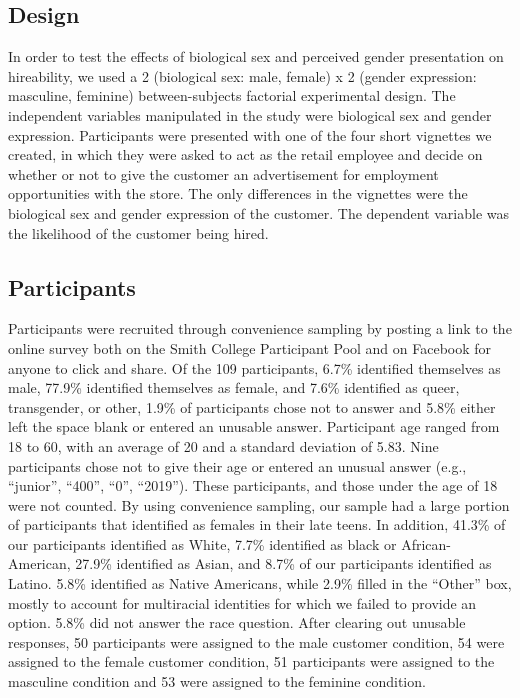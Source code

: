 \documentclass[english,man]{apa6}
\theoremstyle{definition}
\theoremstyle{definition}
\theoremstyle{remark}
\begin{document}
\subsection{Design}\label{design}

In order to test the effects of biological sex and perceived gender
presentation on hireability, we used a 2 (biological sex: male, female)
x 2 (gender expression: masculine, feminine) between-subjects factorial
experimental design. The independent variables manipulated in the study
were biological sex and gender expression. Participants were presented
with one of the four short vignettes we created, in which they were
asked to act as the retail employee and decide on whether or not to give
the customer an advertisement for employment opportunities with the
store. The only differences in the vignettes were the biological sex and
gender expression of the customer. The dependent variable was the
likelihood of the customer being hired.

\subsection{Participants}\label{participants}

Participants were recruited through convenience sampling by posting a
link to the online survey both on the Smith College Participant Pool and
on Facebook for anyone to click and share. Of the 109 participants,
6.7\% identified themselves as male, 77.9\% identified themselves as
female, and 7.6\% identified as queer, transgender, or other, 1.9\% of
participants chose not to answer and 5.8\% either left the space blank
or entered an unusable answer. Participant age ranged from 18 to 60,
with an average of 20 and a standard deviation of 5.83. Nine
participants chose not to give their age or entered an unusual answer
(e.g., \enquote{junior}, \enquote{400}, \enquote{0}, \enquote{2019}).
These participants, and those under the age of 18 were not counted. By
using convenience sampling, our sample had a large portion of
participants that identified as females in their late teens. In
addition, 41.3\% of our participants identified as White, 7.7\%
identified as black or African-American, 27.9\% identified as Asian, and
8.7\% of our participants identified as Latino. 5.8\% identified as
Native Americans, while 2.9\% filled in the \enquote{Other} box, mostly
to account for multiracial identities for which we failed to provide an
option. 5.8\% did not answer the race question. After clearing out
unusable responses, 50 participants were assigned to the male customer
condition, 54 were assigned to the female customer condition, 51
participants were assigned to the masculine condition and 53 were
assigned to the feminine condition.
\end{document}
